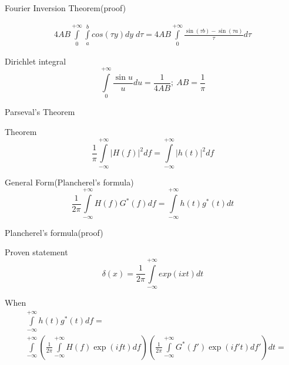 \documentclass[10pt]{beamer}
\begin{document}
\begin{frame}{Fourier Inversion Theorem(proof)}

\begin{align}
4AB \int \limits_{0}^{+\infty} \int \limits_a^b cos(\tau y) dy \; d\tau =   4AB \int \limits_{0}^{+\infty} \frac{\sin(\tau b) - \sin(\tau a)}{\tau} d \tau
\end{align}


\begin{block}{Dirichlet integral}
\begin{equation}
    \int \limits_{0}^{+\infty} \frac{\sin{u}}{u} du = \frac{1}{4AB};\ AB = \frac{1}{\pi}
\end{equation}
\end{block}

\end{frame}


\begin{frame}{Parseval’s Theorem }

\begin{block}{Theorem}
\begin{equation}
        \frac{1}{\pi} \int \limits_{-\infty}^{+\infty} |H(f)|^2 df = \int \limits_{-\infty}^{+\infty} |h(t)|^2 df 
\end{equation}
\end{block}


\begin{block}{General Form(Plancherel’s formula)}
\begin{equation}
        \frac{1}{2\pi} \int \limits_{-\infty}^{+\infty} H(f)G^*(f) df = \int \limits_{-\infty}^{+\infty} h(t) g^*(t) dt
\end{equation}
\end{block}
\end{frame}


\begin{frame}{Plancherel’s formula(proof)}

\begin{block}{Proven statement}
\begin{equation}
    \delta(x) = \frac{1}{2\pi} \int \limits_{-\infty}^{+\infty} exp(ixt)dt
\end{equation}

\end{block}

\begin{block}{When}
    \begin{align}
        &\int \limits_{-\infty}^{+\infty} h(t) g^*(t) df  =\\ 
        &\int \limits_{-\infty}^{+\infty} \left(\frac{1}{2\pi} \int \limits_{-\infty}^{+\infty} H(f) \exp(ift)df \right) \left(\frac{1}{2\pi} \int \limits_{-\infty}^{+\infty} G^*(f') \exp(if't)df' \right)dt  = 
    \end{align}
\end{block}

\end{frame}
\end{document}
